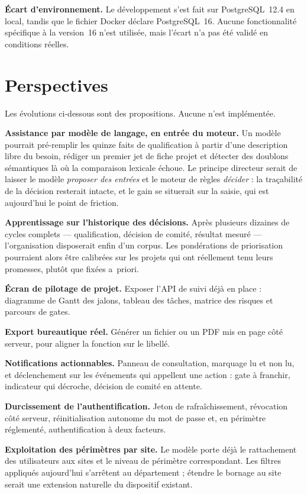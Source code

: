 \textbf{Écart d'environnement.} Le développement s'est fait sur PostgreSQL~12.4 en
local, tandis que le fichier Docker déclare PostgreSQL~16. Aucune fonctionnalité
spécifique à la version~16 n'est utilisée, mais l'écart n'a pas été validé en
conditions réelles.

\section*{Perspectives}

Les évolutions ci-dessous sont des propositions. Aucune n'est implémentée.

\textbf{Assistance par modèle de langage, en entrée du moteur.} Un modèle pourrait
pré-remplir les quinze faits de qualification à partir d'une description libre du
besoin, rédiger un premier jet de fiche projet et détecter des doublons sémantiques
là où la comparaison lexicale échoue. Le principe directeur serait de laisser le modèle
\emph{proposer des entrées} et le moteur de règles \emph{décider} : la traçabilité de la
décision resterait intacte, et le gain se situerait sur la saisie, qui est aujourd'hui
le point de friction.

\textbf{Apprentissage sur l'historique des décisions.} Après plusieurs dizaines de
cycles complets — qualification, décision de comité, résultat mesuré — l'organisation
disposerait enfin d'un corpus. Les pondérations de priorisation pourraient alors être
calibrées sur les projets qui ont réellement tenu leurs promesses, plutôt que fixées
a~priori.

\textbf{Écran de pilotage de projet.} Exposer l'API de suivi déjà en place :
diagramme de Gantt des jalons, tableau des tâches, matrice des risques et parcours de
gates.

\textbf{Export bureautique réel.} Générer un fichier  ou un PDF mis en page
côté serveur, pour aligner la fonction sur le libellé.

\textbf{Notifications actionnables.} Panneau de consultation, marquage lu et non lu, et
déclenchement sur les événements qui appellent une action : gate à franchir, indicateur
qui décroche, décision de comité en attente.

\textbf{Durcissement de l'authentification.} Jeton de rafraîchissement, révocation côté
serveur, réinitialisation autonome du mot de passe et, en périmètre réglementé,
authentification à deux facteurs.

\textbf{Exploitation des périmètres par site.} Le modèle porte déjà le rattachement des
utilisateurs aux sites et le niveau de périmètre correspondant. Les filtres appliqués
aujourd'hui s'arrêtent au département ; étendre le bornage au site serait une extension
naturelle du dispositif existant.

